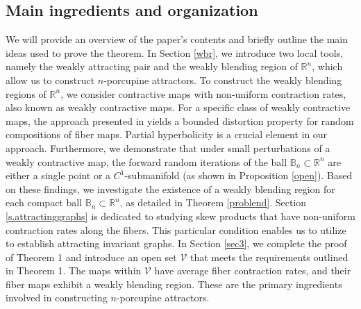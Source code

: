 \documentclass[11pt,reqno]{amsart}
\theoremstyle{plain}
\newtheorem*{theorem A}{Theorem A}
\newtheorem*{theorem B}{Theorem B}
\newtheorem*{theorem C}{Theorem C}
\newtheorem*{theorem 1}{Theorem 1}
\newtheorem*{theorem 2}{Theorem 2}
\newtheorem*{theorem 3}{Theorem 3}
\numberwithin{equation}{section}
\begin{document}
\subsection{Main ingredients and organization}
We will provide an overview of the paper's contents and briefly outline the main ideas used to prove the theorem. In Section \ref{wbr}, we introduce two local tools, namely the weakly attracting pair and the weakly blending region of $\mathbb{R}^n$, which allow us to construct $n$-porcupine attractors. To construct the weakly blending regions of $\mathbb{R}^n$, we consider contractive maps with non-uniform contraction rates, also known as weakly contractive maps. For a specific class of weakly contractive maps, the approach presented in \cite{alves2000srb} yields a bounded distortion property for random compositions of fiber maps.
Partial hyperbolicity is a crucial element in our approach. Furthermore, we demonstrate that under small perturbations of a weakly contractive map, the forward random iterations of the ball $\mathbb{B}_n \subset \mathbb{R}^n$ are either a single point or a $C^1$-submanifold (as shown in Proposition \ref{open}). Based on these findings, we investigate the existence of a weakly blending region for each compact ball $\mathbb{B}_n \subset \mathbb{R}^n$, as detailed in Theorem \ref{problend}.
Section \ref{s.attractinggraphs} is dedicated to studying skew products that have non-uniform contraction rates along the fibers. This particular condition enables us to utilize
\cite[Thm. 1.4]{stark1999regularity} to establish attracting invariant graphs. In Section \ref{sec3}, we complete the proof of Theorem 1 and introduce an open set $\mathcal{V}$ that meets the requirements outlined in Theorem 1. The maps within $\mathcal{V}$ have average fiber contraction rates, and their fiber maps exhibit a weakly blending region.
These are the primary ingredients involved in constructing $n$-porcupine attractors. 
\end{document}
